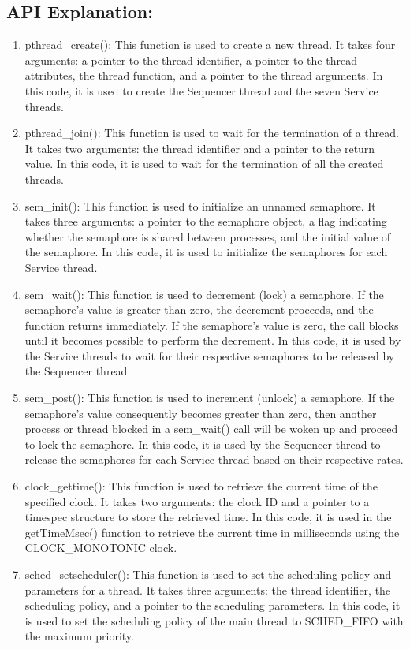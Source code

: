 \documentclass[a4paper,11pt]{article}%
\newenvironment{qanda}{\setlength{\parindent}{0pt}}{\bigskip}
\begin{document}
\begin{qanda}
\begin{enumerate}
			\subsection{API Explanation:}
			\begin{enumerate}
				\item pthread\_create(): This function is used to create a new thread. It takes four arguments: a pointer to the thread identifier, a pointer to the thread attributes, the thread function, and a pointer to the thread arguments. In this code, it is used to create the Sequencer thread and the seven Service threads.
				\item pthread\_join(): This function is used to wait for the termination of a thread. It takes two arguments: the thread identifier and a pointer to the return value. In this code, it is used to wait for the termination of all the created threads.
				\item sem\_init(): This function is used to initialize an unnamed semaphore. It takes three arguments: a pointer to the semaphore object, a flag indicating whether the semaphore is shared between processes, and the initial value of the semaphore. In this code, it is used to initialize the semaphores for each Service thread.
				\item sem\_wait(): This function is used to decrement (lock) a semaphore. If the semaphore's value is greater than zero, the decrement proceeds, and the function returns immediately. If the semaphore's value is zero, the call blocks until it becomes possible to perform the decrement. In this code, it is used by the Service threads to wait for their respective semaphores to be released by the Sequencer thread.
				\item sem\_post(): This function is used to increment (unlock) a semaphore. If the semaphore's value consequently becomes greater than zero, then another process or thread blocked in a sem\_wait() call will be woken up and proceed to lock the semaphore. In this code, it is used by the Sequencer thread to release the semaphores for each Service thread based on their respective rates.
				\item clock\_gettime(): This function is used to retrieve the current time of the specified clock. It takes two arguments: the clock ID and a pointer to a timespec structure to store the retrieved time. In this code, it is used in the getTimeMsec() function to retrieve the current time in milliseconds using the CLOCK\_MONOTONIC clock.
				\item sched\_setscheduler(): This function is used to set the scheduling policy and parameters for a thread. It takes three arguments: the thread identifier, the scheduling policy, and a pointer to the scheduling parameters. In this code, it is used to set the scheduling policy of the main thread to SCHED\_FIFO with the maximum priority.
			\end{enumerate}








\end{enumerate}
\end{qanda}
\end{document}
